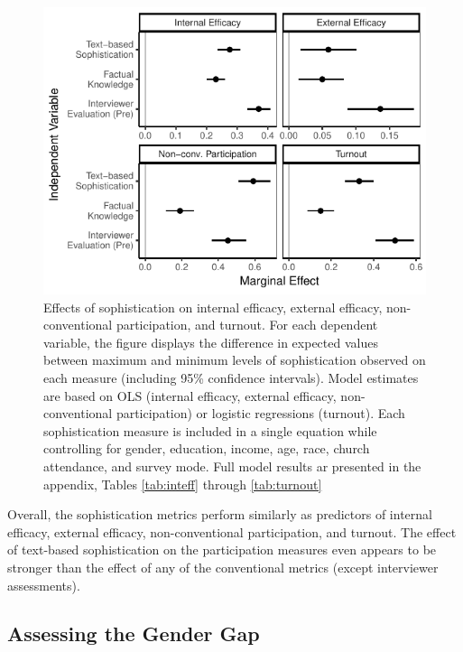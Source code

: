 \documentclass[12pt]{article}
\begin{document}
\begin{figure}[h]\centering
\includegraphics{../fig/knoweff_pres.pdf}
\caption{Effects of sophistication on internal efficacy, external efficacy, non-conventional participation, and turnout. For each dependent variable, the figure displays the difference in expected values between maximum and minimum levels of sophistication observed on each measure (including 95\% confidence intervals). Model estimates are based on OLS (internal efficacy, external efficacy, non-conventional participation) or logistic regressions (turnout). Each sophistication measure is included in a single equation while controlling for gender, education, income, age, race, church attendance, and survey mode. Full model results ar presented in the appendix, Tables \ref{tab:inteff} through \ref{tab:turnout}}\label{fig:knoweff}
\end{figure}

Overall, the sophistication metrics perform similarly as predictors of internal efficacy, external efficacy, non-conventional participation, and turnout. The effect of text-based sophistication on the participation measures even appears to be stronger than the effect of any of the conventional metrics (except interviewer assessments).


\subsection*{Assessing the Gender Gap}
\end{document}
